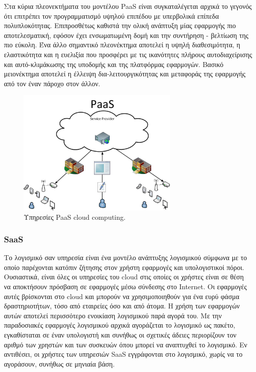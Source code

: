 		Στα κύρια πλεονεκτήματα του μοντέλου PaaS είναι συγκαταλέγεται αρχικά το γεγονός ότι επιτρέπει τον προγραμματισμό υψηλού επιπέδου με υπερβολικά επίπεδα πολυπλοκότητας. Επιπροσθέτως καθιστά την ολική ανάπτυξη μίας εφαρμογής πιο αποτελεσματική, εφόσον έχει ενσωματωμένη δομή και την συντήρηση - βελτίωση της πιο εύκολη. Ένα άλλο σημαντικό πλεονέκτημα αποτελεί η υψηλή διαθεσιμότητα, η ελαστικότητα και η ευελιξία που προσφέρει με τις ικανότητες πλήρους αυτοδιαχείρισης και αυτό-κλιμάκωσης της υποδομής και της πλατφόρμας εφαρμογών. Βασικό μειονέκτημα αποτελεί η έλλειψη δια-λειτουργικότητας και μεταφοράς της εφαρμογής από τον έναν πάροχο στον άλλον. 

	\begin{figure}[h]
	    \centering
	    \includegraphics[width=0.7\textwidth]{PaaS.jpg}
	    \caption{Υπηρεσίες PaaS cloud computing.  }
	    \label{fig:paas}
	\end{figure}

		\subsubsection{SaaS}
	 
	Το λογισμικό σαν υπηρεσία είναι ένα μοντέλο ανάπτυξης λογισμικού σύμφωνα με το οποίο παρέχονται κατόπιν ζήτησης στον χρήστη εφαρμογές και υπολογιστικοί πόροι. Ουσιαστικά, είναι όλες οι υπηρεσίες του cloud στις οποίες οι χρήστες είναι σε θέση να αποκτήσουν πρόσβαση σε εφαρμογές μέσω σύνδεσης στο Internet. Οι εφαρμογές αυτές βρίσκονται στο cloud και μπορούν να χρησιμοποιηθούν για ένα ευρύ φάσμα δραστηριοτήτων, τόσο από εταιρείες όσο και από άτομα. Η χρήση των εφαρμογών αυτών αποτελεί περισσότερο ενοικίαση λογισμικού παρά αγορά του. Με την παραδοσιακές εφαρμογές λογισμικού αρχικά αγοράζεται το λογισμικό ως πακέτο, εγκαθίσταται σε έναν υπολογιστή και συνήθως οι σχετικές άδειες περιορίζουν τον αριθμό των χρηστών και των συσκευών όπου μπορεί να αναπτυχθεί το λογισμικό. Εν αντιθέσει, οι χρήστες των υπηρεσιών SaaS εγγράφονται στο λογισμικό, χωρίς να το αγοράσουν, συνήθως σε μηνιαία βάση. 
	
